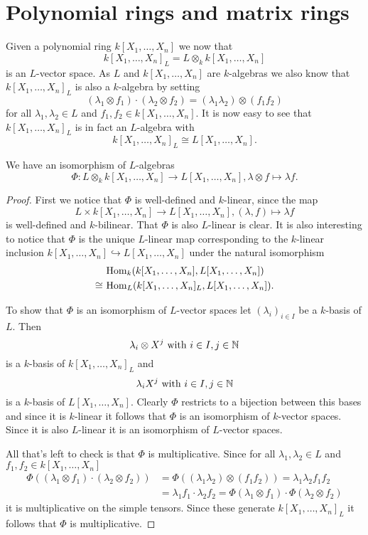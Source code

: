 \section{Polynomial rings and matrix rings}
Given a polynomial ring $k[X_1, \ldots, X_n]$ we now that
\[
 k[X_1, \ldots, X_n]_L = L \otimes_k k[X_1, \ldots, X_n]
\]
is an $L$-vector space. As $L$ and $k[X_1, \ldots, X_n]$ are $k$-algebras we also know that $k[X_1, \ldots, X_n]_L$ is also a $k$-algebra by setting
\[
 (\lambda_1 \otimes f_1) \cdot (\lambda_2 \otimes f_2) = (\lambda_1 \lambda_2) \otimes (f_1 f_2)
\]
for all $\lambda_1, \lambda_2 \in L$ and $f_1, f_2 \in k[X_1, \ldots, X_n]$. It is now easy to see that $k[X_1, \ldots, X_n]_L$ is in fact an $L$-algebra with
\[
 k[X_1, \ldots, X_n]_L \cong L[X_1, \ldots, X_n].
\]


\begin{prop}
 We have an isomorphism of $L$-algebras
 \[
  \Phi \colon L \otimes_k k[X_1, \ldots, X_n] \to L[X_1, \ldots, X_n], \lambda \otimes f \mapsto \lambda f.
 \]
\end{prop}
\begin{proof}
 First we notice that $\Phi$ is well-defined and $k$-linear, since the map
 \[
  L \times k[X_1, \ldots, X_n] \to L[X_1, \ldots, X_n], (\lambda,f) \mapsto \lambda f
 \]
 is well-defined and $k$-bilinear. That $\Phi$ is also $L$-linear is clear. It is also interesting to notice that $\Phi$ is the unique $L$-linear map corresponding to the $k$-linear inclusion $k[X_1, \ldots, X_n] \hookrightarrow L[X_1, \ldots, X_n]$ under the natural isomorphism
 \begin{align*}
       &\, \operatorname{Hom}_k(k[X_1, \ldots, X_n], L[X_1, \ldots, X_n]) \\
  \cong&\, \operatorname{Hom}_L(k[X_1, \ldots, X_n]_L, L[X_1, \ldots, X_n]).
 \end{align*}
 
 To show that $\Phi$ is an isomorphism of $L$-vector spaces let $(\lambda_i)_{i \in I}$ be a $k$-basis of $L$. Then
 \[
  \lambda_i \otimes X^j \text{ with } i \in I, j \in \mathbb{N}
 \]
 is a $k$-basis of $k[X_1, \ldots, X_n]_L$ and
 \[
  \lambda_i X^j \text{ with } i \in I, j \in \mathbb{N}
 \]
 is a $k$-basis of $L[X_1, \ldots, X_n]$. Clearly $\Phi$ restricts to a bijection between this bases and since it is $k$-linear it follows that $\Phi$ is an isomorphism of $k$-vector spaces. Since it is also $L$-linear it is an isomorphism of $L$-vector spaces.
 
 All that’s left to check is that $\Phi$ is multiplicative. Since for all $\lambda_1, \lambda_2 \in L$ and $f_1, f_2 \in k[X_1, \ldots, X_n]$
 \begin{align*}
  \Phi((\lambda_1 \otimes f_1) \cdot (\lambda_2 \otimes f_2))
  &= \Phi((\lambda_1 \lambda_2) \otimes (f_1 f_2))
   = \lambda_1 \lambda_2 f_1 f_2 \\
  &= \lambda_1 f_1 \cdot \lambda_2 f_2
   = \Phi(\lambda_1 \otimes f_1) \cdot \Phi(\lambda_2 \otimes f_2)
 \end{align*}
 it is multiplicative on the simple tensors. Since these generate $k[X_1, \ldots, X_n]_L$ it follows that $\Phi$ is multiplicative.
\end{proof}






















